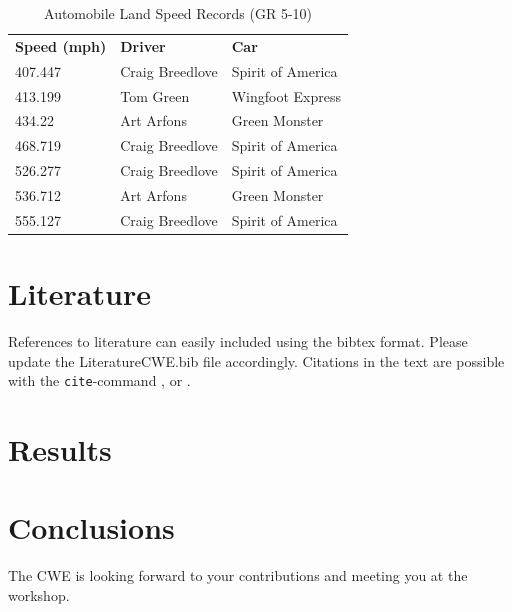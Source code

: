 \documentclass[fleqn,11pt]{SelfArx} %
\newcommand{\headrow}{\rowcolor{color2!5}}
\newcommand{\thead}[1]{\bfseries #1\rule[-1.2ex]{0pt}{2em}}
\begin{document}
\begin{table}[h]
\caption{Automobile Land Speed Records (GR 5-10)}
\label{tab:example}
\centering
\begin{tabular}{l l l}
\headrow \thead{Speed (mph)} & \thead{Driver} & \thead{Car}\\
407.447     & Craig Breedlove & Spirit of America\\
413.199     & Tom Green       & Wingfoot Express \\
434.22      & Art Arfons      & Green Monster   \\
468.719     & Craig Breedlove & Spirit of America \\
526.277     & Craig Breedlove & Spirit of America \\
536.712     & Art Arfons      & Green Monster   \\
555.127     & Craig Breedlove & Spirit of America\\
\end{tabular}

\end{table}

\section{Literature}
References to literature can easily included using the bibtex format. Please update the LiteratureCWE.bib file accordingly. Citations in the text are possible with the \texttt{cite}-command \cite{Matsuda.Cooper.2001}, \cite{Ricciardelli.2001}
or \cite{Tamura.Miyagi.1999}.

\blindtext


\section{Results}
\blindtext

\section{Conclusions}
The CWE is looking forward to your contributions and meeting you at the workshop.

\blindtext

\printbibliography
\end{document}

